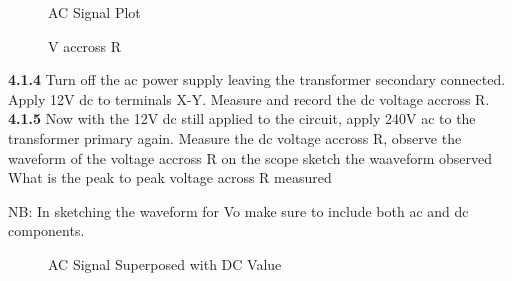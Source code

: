\begin{figure}[H]
    \centering
    \caption{AC Signal Plot}
    \label{fig:ac_signal}
\end{figure}

\begin{figure}[H]
    \centering
    \caption{V accross R}
    \label{fig:ac_signal}
\end{figure}

\textbf{4.1.4} Turn off the ac power supply leaving the transformer secondary connected. Apply 12V dc to terminals X-Y. Measure and record the  dc voltage accross R. \\

\textbf{4.1.5} Now with the 12V dc still applied to the circuit, apply 240V ac to the transformer primary again. Measure the dc voltage accross R, observe the waveform of the voltage accross R on the scope sketch the waaveform observed What is the peak to peak voltage across R measured

NB: In sketching the waveform for Vo make sure to include both ac and dc components. \\

\begin{figure}[H]
    \centering
    \caption{AC Signal Superposed with DC Value}
    \label{fig:ac_dc_signal}
\end{figure}

